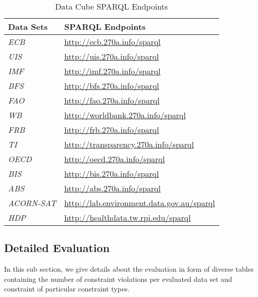 \documentclass{llncs}
\begin{document}
\begin{table}[H]
	\centering
		\begin{tabular}{l|l}
      \textbf{Data Sets} & \textbf{SPARQL Endpoints} \\		
      \hline
      \emph{ECB} & \url{http://ecb.270a.info/sparql} \\
			\emph{UIS} & \url{http://uis.270a.info/sparql} \\
			\emph{IMF} & \url{http://imf.270a.info/sparql} \\
			\emph{BFS} & \url{http://bfs.270a.info/sparql} \\
			\emph{FAO} & \url{http://fao.270a.info/sparql} \\
			\emph{WB} & \url{http://worldbank.270a.info/sparql} \\
			\emph{FRB} & \url{http://frb.270a.info/sparql} \\
			\emph{TI} & \url{http://transparency.270a.info/sparql} \\
			\emph{OECD} & \url{http://oecd.270a.info/sparql} \\
			\emph{BIS} & \url{http://bis.270a.info/sparql} \\
			\emph{ABS} & \url{http://abs.270a.info/sparql} \\
			\emph{ACORN-SAT} & \url{http://lab.environment.data.gov.au/sparql} \\
			\emph{HDP} & \url{http://healthdata.tw.rpi.edu/sparql} \\
		\end{tabular}
	\caption{Data Cube SPARQL Endpoints}
	\label{tab:data-cube-sparql-endpoints}
\end{table}

\subsection{Detailed Evaluation}

In this sub section, we give details about the evaluation in form of diverse tables containing the number of constraint violations per evaluated data set and constraint of particular constraint types.
\end{document}
